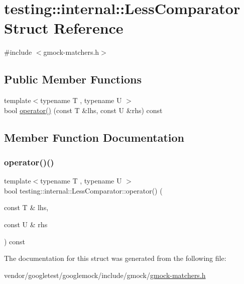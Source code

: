 \hypertarget{structtesting_1_1internal_1_1_less_comparator}{}\section{testing\+:\+:internal\+:\+:Less\+Comparator Struct Reference}
\label{structtesting_1_1internal_1_1_less_comparator}


{\ttfamily \#include $<$gmock-\/matchers.\+h$>$}

\subsection*{Public Member Functions}
\begin{DoxyCompactItemize}
\item 
{\footnotesize template$<$typename T , typename U $>$ }\\bool \hyperlink{structtesting_1_1internal_1_1_less_comparator_a03d072616e29586a62bd638e47d4a11c}{operator()} (const T \&lhs, const U \&rhs) const
\end{DoxyCompactItemize}


\subsection{Member Function Documentation}
\mbox{\label{structtesting_1_1internal_1_1_less_comparator_a03d072616e29586a62bd638e47d4a11c}} 
\subsubsection{\texorpdfstring{operator()()}{operator()()}}
{\footnotesize\ttfamily template$<$typename T , typename U $>$ \\
bool testing\+::internal\+::\+Less\+Comparator\+::operator() (\begin{DoxyParamCaption}\item[{const T \&}]{lhs,  }\item[{const U \&}]{rhs }\end{DoxyParamCaption}) const\hspace{0.3cm}{\ttfamily [inline]}}



The documentation for this struct was generated from the following file\+:\begin{DoxyCompactItemize}
\item 
vendor/googletest/googlemock/include/gmock/\hyperlink{gmock-matchers_8h}{gmock-\/matchers.\+h}\end{DoxyCompactItemize}
